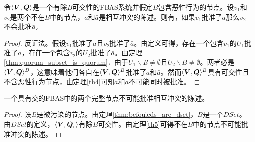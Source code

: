 \begin{theorem}\label{th5}
        令$\langle{\bm V},{\bm Q}\rangle$是一个有除$B${\quorum}可交性的FBAS系统并假定$B$包含恶性行为的节点。设$v_1$和$v_2$是两个不在$B$中的节点，$a$和$\bar a$是相互冲突的陈述。则有，如果$v_1$批准了$a$那么$v_2$不会批准$\bar a$。
\end{theorem}

\begin{proof}
        反证法。假设$v_1$批准了$a$且$v_2$批准了$\bar a$。由定义可得，存在一个包含$v_1$的{\quorum}$U_1$批准了$a$，存在一个包含$v_2$的{\quorum}$U_2$批准了$\bar a$。由定理\ref{thm:quorum_subset_is_quorum}，由于$U_1\backslash B\neq \emptyset$且$U_2\backslash B\neq \emptyset$。两者必是$\langle{\bm V},{\bm Q}\rangle^{B}$，这意味着他们各自在$\langle{\bm V},{\bm Q}\rangle^{B}$批准了$a$和$\bar a$。然而$\langle{\bm V},{\bm Q}\rangle^{B}$具有{\quorum}可交性且不含恶性行为节点，由定理\ref{th4}可知$a$和$\bar a$不可能同时被批准。
\end{proof}

\begin{theorem}\label{th6}
        一个具有{\quorum}交的FBAS中的两个完整节点不可能批准相互冲突的陈述。
\end{theorem}

\begin{proof}
        设$B$是被污染的节点。由定理\ref{thm:befouleds_are_dset}，$B$是一个$DSet$。由$DSet$的定义，$\langle{\bm V},{\bm Q},\rangle$有除$B${\quorum}可交性。由定理\ref{th5}可得不在$B$中的节点不可能批准冲突的陈述。
\end{proof}